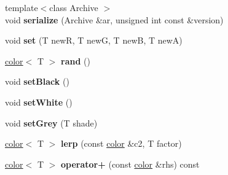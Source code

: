 \begin{DoxyCompactItemize}
\item 
\hypertarget{classNeb_1_1Color_1_1color_af9fdc2ecbaef12c6adb05f77aaddc470}{{\footnotesize template$<$class Archive $>$ }\\void {\bfseries serialize} (\-Archive \&ar, unsigned int const \&version)}\label{classNeb_1_1Color_1_1color_af9fdc2ecbaef12c6adb05f77aaddc470}

\item 
\hypertarget{classNeb_1_1Color_1_1color_a0e1bf847047b917322f4ab3fca23e4af}{void {\bfseries set} (\-T new\-R, \-T new\-G, \-T new\-B, \-T new\-A)}\label{classNeb_1_1Color_1_1color_a0e1bf847047b917322f4ab3fca23e4af}

\item 
\hypertarget{classNeb_1_1Color_1_1color_a3f3767f4606d53d83bbe3757ab4c4677}{\hyperlink{classNeb_1_1Color_1_1color}{color}$<$ \-T $>$ {\bfseries rand} ()}\label{classNeb_1_1Color_1_1color_a3f3767f4606d53d83bbe3757ab4c4677}

\item 
\hypertarget{classNeb_1_1Color_1_1color_a2370eaf8a8b98a5747dcfcda64706989}{void {\bfseries set\-Black} ()}\label{classNeb_1_1Color_1_1color_a2370eaf8a8b98a5747dcfcda64706989}

\item 
\hypertarget{classNeb_1_1Color_1_1color_a68097596e5e47611a255e0c9dddce0fc}{void {\bfseries set\-White} ()}\label{classNeb_1_1Color_1_1color_a68097596e5e47611a255e0c9dddce0fc}

\item 
\hypertarget{classNeb_1_1Color_1_1color_aa8bb28a6ea4d64d8e4cee4768c2b6c83}{void {\bfseries set\-Grey} (\-T shade)}\label{classNeb_1_1Color_1_1color_aa8bb28a6ea4d64d8e4cee4768c2b6c83}

\item 
\hypertarget{classNeb_1_1Color_1_1color_a63ad81955607967426738d1ebdc8ee87}{\hyperlink{classNeb_1_1Color_1_1color}{color}$<$ \-T $>$ {\bfseries lerp} (const \hyperlink{classNeb_1_1Color_1_1color}{color} \&c2, \-T factor)}\label{classNeb_1_1Color_1_1color_a63ad81955607967426738d1ebdc8ee87}

\item 
\hypertarget{classNeb_1_1Color_1_1color_ae56aa7160b7802e9dcbbd089827ef60b}{\hyperlink{classNeb_1_1Color_1_1color}{color}$<$ \-T $>$ {\bfseries operator+} (const \hyperlink{classNeb_1_1Color_1_1color}{color} \&rhs) const }\label{classNeb_1_1Color_1_1color_ae56aa7160b7802e9dcbbd089827ef60b}


\end{DoxyCompactItemize}
